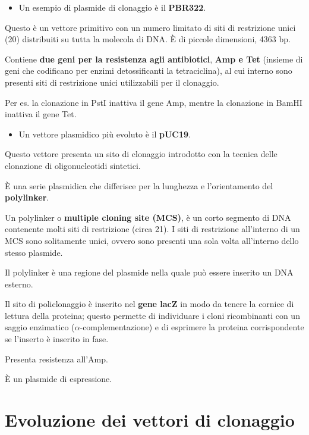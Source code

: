 \documentclass[11pt]{book}
\begin{document}
\begin{itemize}
\itemsep1pt\parskip0pt
\item
  Un esempio di plasmide di clonaggio è il \textbf{PBR322}.
\end{itemize}

Questo è un vettore primitivo con un numero limitato di siti di
restrizione unici (20) distribuiti su tutta la molecola di DNA. È di
piccole dimensioni, 4363 bp.

Contiene \textbf{due geni per la resistenza agli antibiotici},
\textbf{Amp e Tet} (insieme di geni che codificano per enzimi
detossificanti la tetraciclina), al cui interno sono presenti siti di
restrizione unici utilizzabili per il clonaggio.

Per es. la clonazione in PstI inattiva il gene Amp, mentre la clonazione
in BamHI inattiva il gene Tet.

\begin{itemize}
\itemsep1pt\parskip0pt
\item
  Un vettore plasmidico più evoluto è il \textbf{pUC19}.
\end{itemize}

Questo vettore presenta un sito di clonaggio introdotto con la tecnica
delle clonazione di oligonucleotidi sintetici.

È una serie plasmidica che differisce per la lunghezza e l'orientamento
del \textbf{polylinker}.

Un polylinker o \textbf{multiple cloning site (MCS)}, è un corto
segmento di DNA contenente molti siti di restrizione (circa 21). I siti
di restrizione all'interno di un MCS sono solitamente unici, ovvero sono
presenti una sola volta all'interno dello stesso plasmide.

Il polylinker è una regione del plasmide nella quale può essere inserito
un DNA esterno.

Il sito di policlonaggio è inserito nel \textbf{gene lacZ} in modo da
tenere la cornice di lettura della proteina; questo permette di
individuare i cloni ricombinanti con un saggio enzimatico
(\(\alpha\)-complementazione) e di esprimere la proteina corrispondente
se l'inserto è inserito in fase.

Presenta resistenza all'Amp.

È un plasmide di espressione.

\section{Evoluzione dei vettori di
clonaggio}\label{evoluzione-dei-vettori-di-clonaggio}
\end{document}
